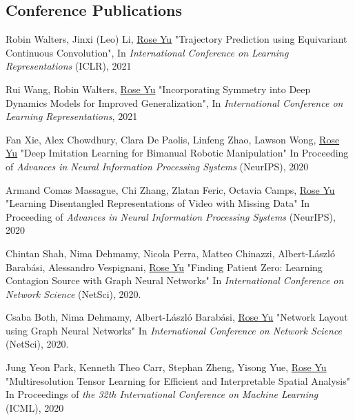 \documentclass[margin,line]{res}
\begin{document}
\begin{resume}
\section{\sc Conference Publications}

\begin{enumerate}[label={[C\arabic*]},  leftmargin=*]
\item  Robin Walters, Jinxi (Leo) Li, \underline{Rose Yu} "Trajectory Prediction using Equivariant Continuous Convolution", In  \textit{International Conference on Learning Representations} (ICLR), 2021

\item  Rui Wang, Robin Walters, \underline{Rose Yu} "Incorporating Symmetry into Deep Dynamics Models for Improved Generalization", In  \textit{International Conference on Learning Representations}, 2021

\item Fan Xie,  Alex  Chowdhury, Clara De Paolis, Linfeng Zhao, Lawson Wong,  \underline{Rose Yu}
"Deep Imitation Learning for Bimanual  Robotic Manipulation"
  In Proceeding of \textit{Advances in Neural Information Processing Systems} (NeurIPS), 2020
  
\item Armand Comas Massague, Chi Zhang, Zlatan Feric, Octavia Camps,  \underline{Rose Yu}
"Learning Disentangled Representations of Video with Missing Data"
  In  Proceeding of \textit{Advances in Neural Information Processing Systems} (NeurIPS), 2020
 
 
\item Chintan Shah, Nima Dehmamy, Nicola Perra, Matteo Chinazzi, Albert-László Barabási, Alessandro Vespignani, \underline{Rose Yu}
"Finding Patient Zero: Learning Contagion Source with Graph Neural Networks"
 In \textit{International Conference on Network Science} (NetSci),  2020. 
     
 \item Csaba Both, Nima Dehmamy,  Albert-László Barabási, \underline{Rose Yu}
"Network Layout using Graph Neural Networks"
 In \textit{International Conference on Network Science} (NetSci),  2020.  
      
\item Jung Yeon Park, Kenneth Theo Carr, Stephan Zheng, Yisong Yue, \underline{Rose Yu}
"Multiresolution Tensor Learning for Efficient and Interpretable Spatial Analysis"
 In Proceedings  of  \textit{the 32th International Conference on Machine Learning} (ICML), 2020


\end{enumerate}
\end{resume}
\end{document}
